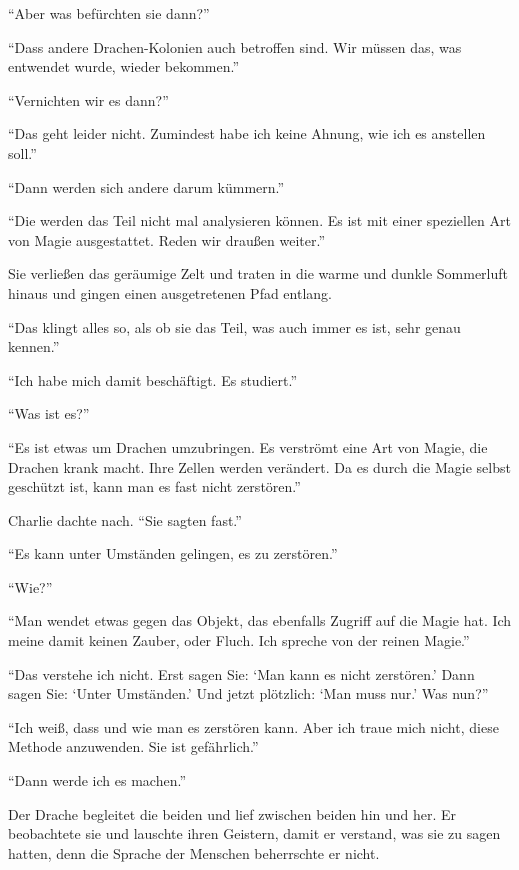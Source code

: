 \enquote{Aber was befürchten sie dann?}

\enquote{Dass andere Drachen-Kolonien auch betroffen sind. Wir müssen das, was entwendet wurde, wieder bekommen.}

\enquote{Vernichten wir es dann?}

\enquote{Das geht leider nicht. Zumindest habe ich keine Ahnung, wie ich es anstellen soll.}

\enquote{Dann werden sich andere darum kümmern.}

\enquote{Die werden das Teil nicht mal analysieren können. Es ist mit einer speziellen Art von Magie ausgestattet. \gst Reden wir draußen weiter.}

Sie verließen das geräumige Zelt und traten in die warme und dunkle Sommerluft hinaus und gingen einen ausgetretenen Pfad entlang.

\enquote{Das klingt alles so, als ob sie das Teil, was auch immer es ist, sehr genau kennen.}

\enquote{Ich habe mich damit beschäftigt. Es studiert.}

\enquote{Was ist es?}

\enquote{Es ist etwas um Drachen umzubringen. Es verströmt eine Art von Magie, die Drachen krank macht. Ihre Zellen werden verändert. Da es durch die Magie selbst geschützt ist, kann man es fast nicht zerstören.}

Charlie dachte nach. \enquote{Sie sagten fast.}

\enquote{Es kann unter Umständen gelingen, es zu zerstören.}

\enquote{Wie?}

\enquote{Man wendet etwas gegen das Objekt, das ebenfalls Zugriff auf die Magie hat. Ich meine damit keinen Zauber, oder Fluch. Ich spreche von der reinen Magie.}

\enquote{Das verstehe ich nicht. Erst sagen Sie: \enquote{Man kann es nicht zerstören.} Dann sagen Sie: \enquote{Unter Umständen.} Und jetzt plötzlich: \enquote{Man muss nur.} Was nun?}

\enquote{Ich weiß, dass und wie man es zerstören kann. Aber ich traue mich nicht, diese Methode anzuwenden. Sie ist gefährlich.}

\enquote{Dann werde ich es machen.}

Der Drache begleitet die beiden und lief zwischen beiden hin und her. Er beobachtete sie und lauschte ihren Geistern, damit er verstand, was sie zu sagen hatten, denn die Sprache der Menschen beherrschte er nicht.


